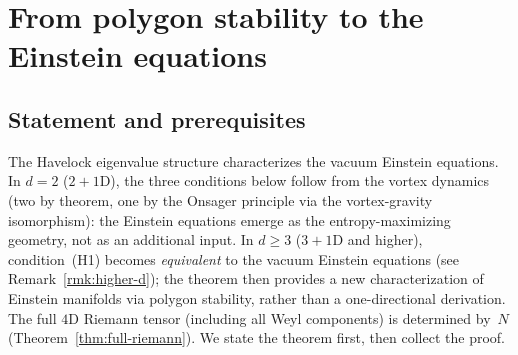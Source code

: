 \section{From polygon stability to the Einstein equations}
\label{sec:lichnerowicz}

\subsection{Statement and prerequisites}

The Havelock eigenvalue structure characterizes the vacuum
Einstein equations.
In $d = 2$ ($2{+}1$D), the three conditions below follow
from the vortex dynamics (two by theorem, one by the Onsager
principle via the vortex-gravity isomorphism):
the Einstein equations emerge as the entropy-maximizing
geometry, not as an additional input.
In $d \ge 3$ ($3{+}1$D and higher), condition~(H1)
becomes \emph{equivalent} to the vacuum Einstein equations
(see Remark~\ref{rmk:higher-d}); the theorem then provides a new
characterization of Einstein manifolds via polygon stability, rather
than a one-directional derivation.
The full $4$D Riemann tensor (including all Weyl components)
is determined by~$N$ (Theorem~\ref{thm:full-riemann}).
We state the theorem first, then collect the proof.


